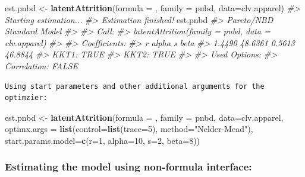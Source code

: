 \documentclass[
]{article}
\newenvironment{Shaded}{\begin{snugshade}}{\end{snugshade}}
\newcommand{\AttributeTok}[1]{\textcolor[rgb]{0.13,0.29,0.53}{#1}}
\newcommand{\CommentTok}[1]{\textcolor[rgb]{0.56,0.35,0.01}{\textit{#1}}}
\newcommand{\DecValTok}[1]{\textcolor[rgb]{0.00,0.00,0.81}{#1}}
\newcommand{\FunctionTok}[1]{\textcolor[rgb]{0.13,0.29,0.53}{\textbf{#1}}}
\newcommand{\NormalTok}[1]{#1}
\newcommand{\OtherTok}[1]{\textcolor[rgb]{0.56,0.35,0.01}{#1}}
\newcommand{\StringTok}[1]{\textcolor[rgb]{0.31,0.60,0.02}{#1}}
\begin{document}
\begin{Shaded}
\begin{Highlighting}[]
\NormalTok{   est.pnbd }\OtherTok{\textless{}{-}} \FunctionTok{latentAttrition}\NormalTok{(}\AttributeTok{formula =}\NormalTok{ , }\AttributeTok{family =}\NormalTok{ pnbd, }\AttributeTok{data=}\NormalTok{clv.apparel)}
\CommentTok{\#\textgreater{} Starting estimation...}
\CommentTok{\#\textgreater{} Estimation finished!}
\NormalTok{   est.pnbd}
\CommentTok{\#\textgreater{} Pareto/NBD Standard Model}
\CommentTok{\#\textgreater{} }
\CommentTok{\#\textgreater{} Call:}
\CommentTok{\#\textgreater{} latentAttrition(family = pnbd, data = clv.apparel)}
\CommentTok{\#\textgreater{} }
\CommentTok{\#\textgreater{} Coefficients:}
\CommentTok{\#\textgreater{}       r    alpha        s     beta  }
\CommentTok{\#\textgreater{}  1.4490  48.6361   0.5613  46.8844  }
\CommentTok{\#\textgreater{} KKT1: TRUE }
\CommentTok{\#\textgreater{} KKT2: TRUE }
\CommentTok{\#\textgreater{} }
\CommentTok{\#\textgreater{} Used Options:}
\CommentTok{\#\textgreater{} Correlation:     FALSE}
\end{Highlighting}
\end{Shaded}

\begin{verbatim}
Using start parameters and other additional arguments for the optimzier:
\end{verbatim}

\begin{Shaded}
\begin{Highlighting}[]
\NormalTok{  est.pnbd }\OtherTok{\textless{}{-}} \FunctionTok{latentAttrition}\NormalTok{(}\AttributeTok{formula =}\NormalTok{ , }\AttributeTok{family =}\NormalTok{ pnbd, }\AttributeTok{data=}\NormalTok{clv.apparel, }
                              \AttributeTok{optimx.args =} \FunctionTok{list}\NormalTok{(}\AttributeTok{control=}\FunctionTok{list}\NormalTok{(}\AttributeTok{trace=}\DecValTok{5}\NormalTok{),}
                                       \AttributeTok{method=}\StringTok{"Nelder{-}Mead"}\NormalTok{), }
                              \AttributeTok{start.params.model=}\FunctionTok{c}\NormalTok{(}\AttributeTok{r=}\DecValTok{1}\NormalTok{, }\AttributeTok{alpha=}\DecValTok{10}\NormalTok{, }\AttributeTok{s=}\DecValTok{2}\NormalTok{, }\AttributeTok{beta=}\DecValTok{8}\NormalTok{))}
\end{Highlighting}
\end{Shaded}

\subsubsection{\texorpdfstring{\textbf{Estimating the model using
non-formula
interface:}}{Estimating the model using non-formula interface:}}\label{estimating-the-model-using-non-formula-interface}
\end{document}
